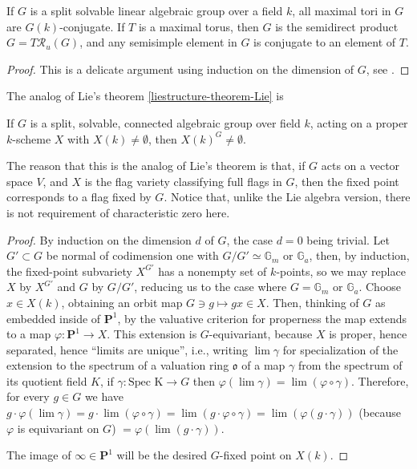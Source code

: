 \begin{proposition}
 \label{proposition-Levi-solvable}
If $G$ is a split solvable linear algebraic group over a field $k$, all maximal tori in $G$ are $G(k)$-conjugate. If $T$ is a maximal torus, then $G$ is the semidirect product $G=T\mathcal R_u(G)$, and any semisimple element in $G$ is conjugate to an element of $T$. 
\end{proposition}

\begin{proof}
 This is a delicate argument using induction on the dimension of $G$, see \cite[Theorem 10.6]{Borel-LAG}. 
\end{proof}





The analog of Lie's theorem \ref{liestructure-theorem-Lie} is 
\begin{theorem}
\label{theorem-Borel-fixed-point}
 If $G$ is a split, solvable, connected algebraic group over field $k$, acting on a proper $k$-scheme $X$ with $X(k)\ne \emptyset$, then $X(k)^G\ne \emptyset$. 
\end{theorem}

The reason that this is the analog of Lie's theorem is that, if $G$ acts on a vector space $V$, and $X$ is the flag variety classifying full flags in $G$, then the fixed point corresponds to a flag fixed by $G$. Notice that, unlike the Lie algebra version, there is not requirement of characteristic zero here.

\begin{proof}
 By induction on the dimension $d$ of $G$, the case $d=0$ being trivial. Let $G'\subset G$ be normal of codimension one with $G/G'\simeq \mathbb G_m$ or $\mathbb G_a$, then, by induction, the fixed-point subvariety $X^{G'}$ has a nonempty set of $k$-points, so we may replace $X$ by $X^{G'}$ and $G$ by $G/G'$, reducing us to the case where $G=\mathbb G_m$ or $\mathbb G_a$. Choose $x\in X(k)$, obtaining an orbit map $G\ni g\mapsto gx\in X$.  Then, thinking of $G$ as embedded inside of $\mathbf P^1$, by the valuative criterion for properness the map extends to a map $\varphi:\mathbf P^1\to X$. This extension is $G$-equivariant, because $X$ is proper, hence separated, hence ``limits are unique'', i.e., writing $\lim \gamma$ for specialization of the extension to the spectrum of a valuation ring $\mathfrak o$ of a map $\gamma$ from the spectrum of its quotient field $K$, if $\gamma: \text{Spec K} \to G$ then $\varphi(\lim \gamma) = \lim (\varphi \circ \gamma)$. Therefore, for every $g\in G$ we have $g\cdot \varphi(\lim \gamma) = g\cdot \lim (\varphi\circ\gamma) = \lim( g\cdot \varphi\circ\gamma) = \lim(\varphi(g\cdot \gamma))$ (because $\varphi$ is equivariant on $G$) $= \varphi(\lim (g\cdot\gamma))$. 
 
 The image of $\infty\in \mathbf P^1$ will be the desired $G$-fixed point on $X(k)$.
\end{proof}




